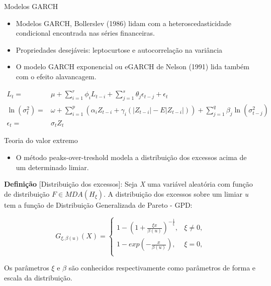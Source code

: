 \documentclass[ignorenonframetext,]{beamer}
\providecommand{\tightlist}{%
\setlength{\itemsep}{0pt}\setlength{\parskip}{0pt}}
\begin{document}
\begin{frame}{Modelos GARCH}

\begin{itemize}
\item
  Modelos GARCH, Bollerslev (1986) lidam com a heteroscedasticidade
  condicional encontrada nas séries financeiras.
\item
  Propriedades desejáveis: leptocurtose e autocorrelação na variância
\item
  O modelo GARCH exponencial ou eGARCH de Nelson (1991) lida também com
  o efeito alavancagem.
\end{itemize}

\begin{align*}
    L_t=&\mu+ \sum_{i=1}^r\phi_i L_{t-i}+ \sum\limits_{j=1}^{s}\theta_j\epsilon_{t-j} +\epsilon_t \\
    \ln(\sigma_t^2)=&\omega+ \sum\limits_{i=1}^{p}(\alpha_i Z_{t-i}+ \gamma_i(|Z_{t-i}|-E|Z_{t-i}|))+ \sum\limits_{j=1}^{q}\beta_j \ln(\sigma_{t-j}^2) \\
    \epsilon_t=&\sigma_t Z_t
\end{align*}

\end{frame}

\begin{frame}{Teoria do valor extremo}

\begin{itemize}
\tightlist
\item
  O método peaks-over-treshold modela a distribuição dos excessos acima
  de um determinado limiar.
\end{itemize}

\textbf{Definição} {[}Distribuição dos excessos{]}: Seja \emph{X} uma
variável aleatória com função de distribuição \(F \in MDA(H_\xi)\). A
distribuição dos excessos sobre um limiar \emph{u} tem a função de
Distribuição Generalizada de Pareto - GPD:

\begin{equation*}
  G_{\xi,\beta(u)}(X) = 
  \begin{cases}
    1- \left(1+ \frac{\xi x}{\beta(u)} \right)^{-\frac{1}{\xi}}, & \xi \neq 0,\\
    1-exp\left(-\frac{x}{\beta(u)}\right), & \xi = 0,\\
  \end{cases}
\end{equation*}

Os parâmetros \(\xi\) e \(\beta\) são conhecidos respectivamente como
parâmetros de forma e escala da distribuição.

\end{frame}
\end{document}
